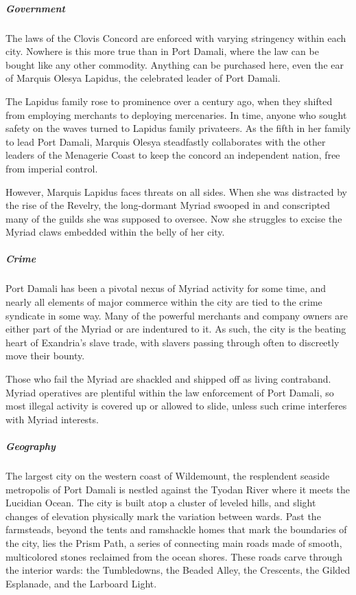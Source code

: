 \documentclass[10pt,a4paper,twoside,bg=print,twocolumn,openany,nodeprecatedcode]{dndbook}
\begin{document}
\subparagraph{Government}
The laws of the Clovis Concord are enforced with varying stringency within each city. Nowhere is this more true than in Port Damali, where the law can be bought like any other commodity. Anything can be purchased here, even the ear of Marquis Olesya Lapidus, the celebrated leader of Port Damali.

The Lapidus family rose to prominence over a century ago, when they shifted from employing merchants to deploying mercenaries. In time, anyone who sought safety on the waves turned to Lapidus family privateers. As the fifth in her family to lead Port Damali, Marquis Olesya steadfastly collaborates with the other leaders of the Menagerie Coast to keep the concord an independent nation, free from imperial control.

However, Marquis Lapidus faces threats on all sides. When she was distracted by the rise of the Revelry, the long-dormant Myriad swooped in and conscripted many of the guilds she was supposed to oversee. Now she struggles to excise the Myriad claws embedded within the belly of her city.

\subparagraph{Crime}
Port Damali has been a pivotal nexus of Myriad activity for some time, and nearly all elements of major commerce within the city are tied to the crime syndicate in some way. Many of the powerful merchants and company owners are either part of the Myriad or are indentured to it. As such, the city is the beating heart of Exandria's slave trade, with slavers passing through often to discreetly move their bounty.

Those who fail the Myriad are shackled and shipped off as living contraband. Myriad operatives are plentiful within the law enforcement of Port Damali, so most illegal activity is covered up or allowed to slide, unless such crime interferes with Myriad interests.

\subparagraph{Geography}
The largest city on the western coast of Wildemount, the resplendent seaside metropolis of Port Damali is nestled against the Tyodan River where it meets the Lucidian Ocean. The city is built atop a cluster of leveled hills, and slight changes of elevation physically mark the variation between wards. Past the farmsteads, beyond the tents and ramshackle homes that mark the boundaries of the city, lies the Prism Path, a series of connecting main roads made of smooth, multicolored stones reclaimed from the ocean shores. These roads carve through the interior wards: the Tumbledowns, the Beaded Alley, the Crescents, the Gilded Esplanade, and the Larboard Light.
\end{document}
